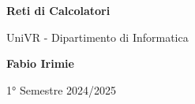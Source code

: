 \begin{titlepage}
	\begin{center}
		\vspace*{1cm}

		\Huge
    \textbf{Reti di Calcolatori}

		\vspace{0.5cm}
		\LARGE
		UniVR - Dipartimento di Informatica

		\vspace{1.5cm}

		\textbf{Fabio Irimie}

		\vfill


		\vspace{0.8cm}


		1° Semestre 2024/2025

	\end{center}
\end{titlepage}
